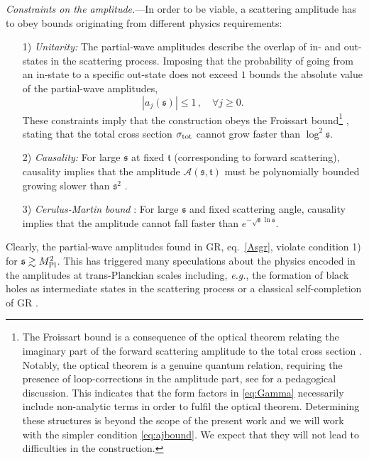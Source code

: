 \documentclass[aps,prl,onecolumn,superscriptaddress,longbibliography,nofootinbib,floatfix,showpacs,12pt]{revtex4-1}
\newcommand{\cA}{{\mathcal A}}
\newcommand{\GR}{{\small GR}}
\newcommand{\eg}{{\textit{e.g.}}}
\newcommand{\be}{\begin{equation}}
\newcommand{\ee}{\end{equation}}
\newcommand{\mans}{\ensuremath{\mathfrak{s}}}
\newcommand{\mant}{\ensuremath{\mathfrak{t}}}
\begin{document}
\textit{Constraints on the amplitude.}---In order to be viable,  a scattering amplitude has to obey bounds originating from different physics requirements:
\begin{enumerate}
	\item[1)] \emph{Unitarity:}
		The partial-wave amplitudes describe the overlap of in- and out-states in the scattering process.
		Imposing that the probability of going from an in-state to a specific out-state does not exceed $1$ bounds the absolute value of the partial-wave amplitudes,
	\be\label{eq:ajbound}
 \left| a_j(\mans) \right| \le 1 \, , \quad \forall j \ge 0 . 
	\ee
		These constraints imply that the construction obeys the Froissart bound\footnote{The Froissart bound is a consequence of the optical theorem relating the imaginary part of the forward scattering amplitude to the total cross section \cite{Froissart:2010}. Notably, the optical theorem is a genuine quantum relation, requiring the presence of loop-corrections in the amplitude part, see \cite{Anselmi:2019xac} for a pedagogical discussion. This indicates that the form factors in \eqref{eq:Gamma} necessarily include non-analytic terms in order to fulfil the optical theorem. Determining these structures is beyond the scope of the present work and we will work with the simpler condition \eqref{eq:ajbound}. We expect that they will not lead to difficulties in the construction.}  \cite{Froissart:1961ux, Froissart:2010}, stating that the total cross section $\sigma_{\rm tot}$ cannot grow faster than $\log^2 \mans$. 
%

	\item[2)] \emph{Causality:}
		For large $\mans$ at fixed $\mant$ (corresponding to forward scattering), causality implies that the amplitude $\cA(\mans,\mant)$ must be polynomially bounded growing slower than $\mans^2$ \cite{Camanho:2014apa}.
%

	\item[3)] \emph{Cerulus-Martin bound} \cite{Cerulus:1964cjb,Epstein:2019zdn}:
	For large $\mans$ and fixed scattering angle, causality implies that the amplitude cannot fall faster than $e^{-\sqrt{\mans} \ln \mans}$.
\end{enumerate}
%
Clearly, the partial-wave amplitudes found in \GR{}, eq.\ \eqref{Asgr}, violate condition 1) for $\mans \gtrsim M_{\rm Pl}^2$.
This has triggered many speculations about the physics encoded in the amplitudes at trans-Planckian scales including, \eg{}, the formation of black holes as intermediate states in the scattering process \cite{Giddings:2009gj} or a classical self-completion of \GR{} \cite{Dvali:2010jz}.
\end{document}
